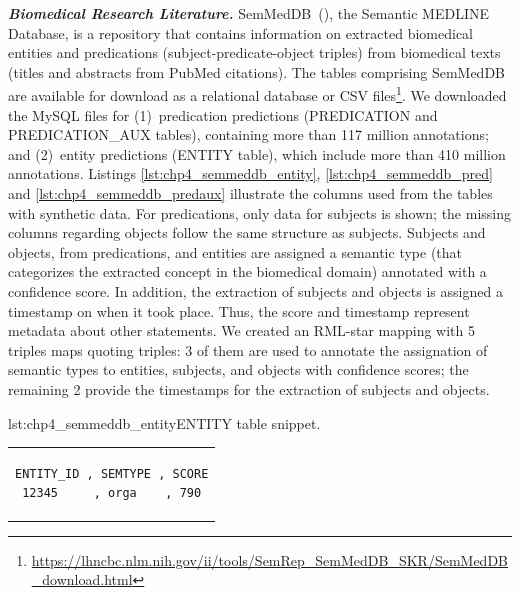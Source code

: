 

\noindent\textbf{\textit{Biomedical Research Literature.}} 
SemMedDB~(\cite{SemMedDB}), the Semantic MEDLINE Database, is a repository 
that contains information on extracted biomedical entities 
and predications (subject-predicate-object triples) 
from biomedical texts (titles and abstracts from PubMed citations). 
The tables comprising SemMedDB are available for download as a relational database or CSV files\footnote{ \url{https://lhncbc.nlm.nih.gov/ii/tools/SemRep_SemMedDB_SKR/SemMedDB_download.html}}.
We downloaded the MySQL files for (1)~predication predictions (PREDICATION and PREDICATION\_AUX tables), containing more than 117 million annotations; and (2)~entity predictions (ENTITY table), which include more than 410 million annotations.
Listings \ref{lst:chp4_semmeddb_entity}, \ref{lst:chp4_semmeddb_pred} and \ref{lst:chp4_semmeddb_predaux} illustrate the columns used from the tables with synthetic data. 
For predications, only data for subjects is shown; the missing columns regarding objects follow the same structure as subjects.
Subjects and objects, from predications, and entities are assigned a semantic type 
(that categorizes the extracted concept in the biomedical domain) annotated with a confidence score. 
In addition, the extraction of subjects and objects is assigned a timestamp on when it took place. 
Thus, the score and timestamp represent metadata about other statements.
We created an RML-star mapping with 5 triples maps quoting triples:
3 of them are used to annotate the assignation of semantic types to entities, subjects, and objects with confidence scores;
the remaining 2 provide the timestamps for the extraction of subjects and objects. 

\begin{minipage}{\linewidth}
\begin{captionedlisting}{lst:chp4_semmeddb_entity}{ENTITY table snippet.}
\centering
\begin{tabular}{c}
{
\begin{lstlisting}[basicstyle=\ttfamily\small,label={list:example1},columns=flexible]
ENTITY_ID , SEMTYPE , SCORE
12345     , orga    , 790
\end{lstlisting}
}
\end{tabular}
\end{captionedlisting}
\end{minipage}

